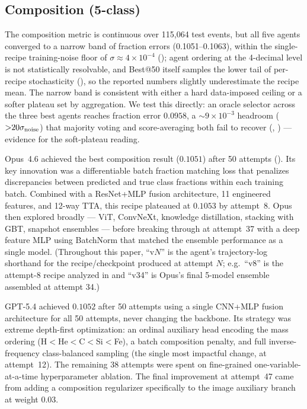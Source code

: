 \documentclass[universe,article,submit,pdftex,oneauthor]{Definitions/mdpi}
\begin{document}
\subsection{Composition (5-class)}

The composition metric is continuous over 115{,}064 test events, but all five agents converged to a narrow band of fraction errors (0.1051--0.1063), within the single-recipe training-noise floor of $\sigma \approx 4 \times 10^{-4}$ (); agent ordering at the 4-decimal level is not statistically resolvable, and Best@50 itself samples the lower tail of per-recipe stochasticity (), so the reported numbers slightly underestimate the recipe mean. The narrow band is consistent with either a hard data-imposed ceiling or a softer plateau set by aggregation. We test this directly: an oracle selector across the three best agents reaches fraction error $0.0958$, a ${\sim}9 \times 10^{-3}$ headroom (${>}20\sigma_{\rm noise}$) that majority voting and score-averaging both fail to recover (, ) --- evidence for the soft-plateau reading.

Opus~4.6 achieved the best composition result ($0.1051$) after 50 attempts (). Its key innovation was a differentiable batch fraction matching loss that penalizes discrepancies between predicted and true class fractions within each training batch. Combined with a ResNet+MLP fusion architecture, 11 engineered features, and 12-way TTA, this recipe plateaued at $0.1053$ by attempt~8. Opus then explored broadly --- ViT, ConvNeXt, knowledge distillation, stacking with GBT, snapshot ensembles --- before breaking through at attempt~37 with a deep feature MLP using BatchNorm that matched the ensemble performance as a single model. (Throughout this paper, ``v$N$'' is the agent's trajectory-log shorthand for the recipe/checkpoint produced at attempt $N$; e.g.\ ``v8'' is the attempt-8 recipe analyzed in  and ``v34'' is Opus's final 5-model ensemble assembled at attempt 34.)

GPT-5.4 achieved $0.1052$ after 50 attempts using a single CNN+MLP fusion architecture for all 50 attempts, never changing the backbone. Its strategy was extreme depth-first optimization: an ordinal auxiliary head encoding the mass ordering (H$<$He$<$C$<$Si$<$Fe), a batch composition penalty, and full inverse-frequency class-balanced sampling (the single most impactful change, at attempt~12). The remaining 38 attempts were spent on fine-grained one-variable-at-a-time hyperparameter ablation. The final improvement at attempt~47 came from adding a composition regularizer specifically to the image auxiliary branch at weight 0.03.
\end{document}
